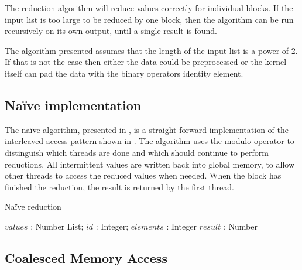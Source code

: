 
The reduction algorithm will reduce values correctly for individual blocks. If
the input list is too large to be reduced by one block, then the algorithm can
be run recursively on its own output, until a single result is found.

The algorithm presented assumes that the length of the input list is a
power of 2. If that is not the case then either the data could be
preprocessed or the kernel itself can pad the data with the binary
operators identity element.

\subsection{Naïve implementation}

The naïve algorithm, presented in , is a
straight forward implementation of the interleaved access pattern
shown in . The algorithm uses the modulo operator
to distinguish which threads are done and which should continue to
perform reductions. All intermittent values are written back into
global memory, to allow other threads to access the reduced values
when needed. When the block has finished the reduction, the result
is returned by the first thread.

\begin{algorithm}
  \caption{Naïve reduction}
  \label{alg:naiveReduct}
  \begin{algorithmic}
              {$values$ : Number List; $id$ : Integer; $elements$ : Integer}
              {$result$ : Number}
              {
                  \ENDIF
                  \SYNC
                \ENDWHILE
                \ENDIF
              }
  \end{algorithmic}
\end{algorithm}

\subsection{Coalesced Memory Access}


